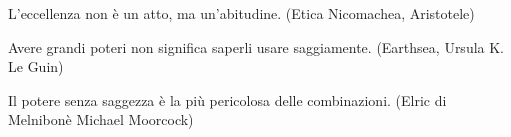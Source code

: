 \bigskip

\begin{enfasi}

	L'eccellenza non è un atto, ma un'abitudine. (Etica Nicomachea, Aristotele)

	\medskip

	Avere grandi poteri non significa saperli usare saggiamente. (Earthsea, Ursula K. Le Guin)

	\medskip

	Il potere senza saggezza è la più pericolosa delle combinazioni. (Elric di Melnibonè Michael Moorcock)

\end{enfasi}

\pagebreak

